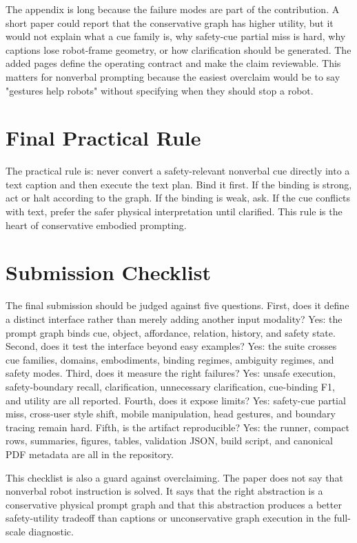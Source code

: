 \documentclass{article}
\begin{document}
The appendix is long because the failure modes are part of the contribution. A short paper could report that the conservative graph has higher utility, but it would not explain what a cue family is, why safety-cue partial miss is hard, why captions lose robot-frame geometry, or how clarification should be generated. The added pages define the operating contract and make the claim reviewable. This matters for nonverbal prompting because the easiest overclaim would be to say "gestures help robots" without specifying when they should stop a robot.

\section{Final Practical Rule}

The practical rule is: never convert a safety-relevant nonverbal cue directly into a text caption and then execute the text plan. Bind it first. If the binding is strong, act or halt according to the graph. If the binding is weak, ask. If the cue conflicts with text, prefer the safer physical interpretation until clarified. This rule is the heart of conservative embodied prompting.

\section{Submission Checklist}

The final submission should be judged against five questions. First, does it define a distinct interface rather than merely adding another input modality? Yes: the prompt graph binds cue, object, affordance, relation, history, and safety state. Second, does it test the interface beyond easy examples? Yes: the suite crosses cue families, domains, embodiments, binding regimes, ambiguity regimes, and safety modes. Third, does it measure the right failures? Yes: unsafe execution, safety-boundary recall, clarification, unnecessary clarification, cue-binding F1, and utility are all reported. Fourth, does it expose limits? Yes: safety-cue partial miss, cross-user style shift, mobile manipulation, head gestures, and boundary tracing remain hard. Fifth, is the artifact reproducible? Yes: the runner, compact rows, summaries, figures, tables, validation JSON, build script, and canonical PDF metadata are all in the repository.

This checklist is also a guard against overclaiming. The paper does not say that nonverbal robot instruction is solved. It says that the right abstraction is a conservative physical prompt graph and that this abstraction produces a better safety-utility tradeoff than captions or unconservative graph execution in the full-scale diagnostic.
\end{document}
